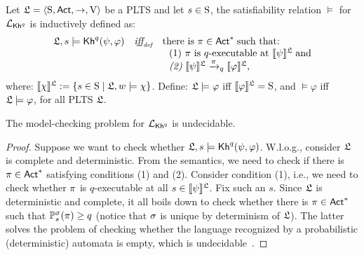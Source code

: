 \begin{definition}
    Let $\model = \tup{\S,\Act,\ra,\V}$ be a PLTS and let $s\in\S$, the satisfiability relation $\models$ for $\PKh$ is inductively defined as:
    \[
        \begin{array}{l@{\ \ \ }c@{\ \ \  }l}
        \model, s \models \kh^q(\psi,\varphi) & \iffdef & \text{there is } \plan \in \Act^* \;\text{such that:} \\
        & & \ \ \text{\rm (1)} \ \plan \text{ is $q$-executable at }  \truthset{\model}{\psi}\; \text{and} \\
        & & \ \ \text{\em (2)} \ \truthset{\model}{\psi} \reach{\plan}_q \truthset{\model}{\varphi}, 
        \end{array}
        \] 
        where: $\truthset{\model}{\chi} := \csetsc{s\in\S}{\model,w\models\chi}$. Define: $\model\models\varphi$ iff  $\truthset{\model}{\varphi}=\S$, and $\models\varphi$ iff $\model\models\varphi$, for all PLTS $\model$.
\end{definition}

\begin{theorem}\label{th:mc-khp-undecidable}
The model-checking problem for $\PKh$ is undecidable.
\end{theorem}

\begin{proof}
    Suppose we want to check whether $\model,s\models\kh^q(\psi,\varphi)$.  W.l.o.g., consider $\model$ is complete and deterministic. 
    From the semantics, we need to check if there is $\plan\in\Act^*$ satisfying conditions (1) and (2). Consider condition (1), i.e., we need to check whether $\plan$ is $q$-executable at all $s\in\truthset{\model}{\psi}$. Fix such an $s$. Since $\model$ is deterministic and complete, it all boils down to check whether there is $\plan\in\Act^*$ such that $\Prob^\strat_s(\plan)\geq q$ (notice that $\strat$ is unique by determinism of $\model$). 
    The latter solves the problem of checking whether the language recognized by a probabilistic (deterministic) automata is empty, which is undecidable~\cite{MadaniHC99}. 
\end{proof}


